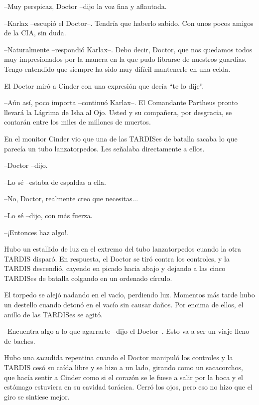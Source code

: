 --Muy perspicaz, Doctor --dijo la voz fina y aflautada.

--Karlax --escupió el Doctor--. Tendría que haberlo sabido. Con unos pocos amigos de la CIA, sin duda.

--Naturalmente --respondió Karlax--. Debo decir, Doctor, que nos quedamos todos muy impresionados por la manera en la que pudo librarse de nuestros guardias. Tengo entendido que siempre ha sido muy difícil mantenerle en una celda.



El Doctor miró a Cinder con una expresión que decía ``te lo dije''.



--Aún así, poco importa --continuó Karlax--. El Comandante Partheus pronto llevará la Lágrima de Isha al Ojo. Usted y su compañera, por desgracia, se contarán entre los miles de millones de muertos.



En el monitor Cinder vio que una de las TARDISes de batalla sacaba lo que parecía un tubo lanzatorpedos. Les señalaba directamente a ellos. 



--Doctor --dijo.

--Lo sé --estaba de espaldas a ella.

--No, Doctor, realmente creo que necesitas...

--Lo sé --dijo, con más fuerza.

--¡Entonces haz algo!.



Hubo un estallido de luz en el extremo del tubo lanzatorpedos cuando la otra TARDIS disparó. En respuesta, el Doctor se tiró contra los controles, y la TARDIS descendió, cayendo en picado hacia abajo y dejando a las cinco TARDISes de batalla colgando en un ordenado círculo.

El torpedo se alejó nadando en el vacío, perdiendo luz. Momentos más tarde hubo un destello cuando detonó en el vacío sin causar daños. Por encima de ellos, el anillo de las TARDISes se agitó.



--Encuentra algo a lo que agarrarte --dijo el Doctor--. Esto va a ser un viaje lleno de baches.



Hubo una sacudida repentina cuando el Doctor manipuló los controles y la TARDIS cesó su caída libre y se hizo a un lado, girando como un sacacorchos, que hacía sentir a Cinder como si el corazón se le fuese a salir por la boca y el estómago estuviera en su cavidad torácica. Cerró los ojos, pero eso no hizo que el giro se sintiese mejor.

